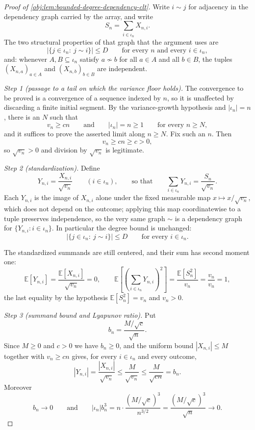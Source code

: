 \begin{proof}[Proof of \cref{obj:lem:bounded-degree-dependency-clt}]
Write \(i\sim j\) for adjacency in the dependency graph carried by the array, and write
\[
S_n=\sum_{i\in\iota_n}X_{n,i}.
\]
The two structural properties of that graph that the argument uses are
\[
\left|\{j\in\iota_n:\ j\sim i\}\right|\le D
\qquad\text{for every }n\text{ and every }i\in\iota_n,
\]
and: whenever \(A,B\subseteq\iota_n\) satisfy \(a\not\sim b\) for all \(a\in A\) and all \(b\in B\), the tuples \((X_{n,a})_{a\in A}\) and \((X_{n,b})_{b\in B}\) are independent.

\textit{Step 1 (passage to a tail on which the variance floor holds).}
The convergence to be proved is a convergence of a sequence indexed by \(n\), so it is unaffected by discarding a finite initial segment. By the variance-growth hypothesis and \(|\iota_n|=n\), there is an \(N\) such that
\[
v_n\ge cn
\qquad\text{and}\qquad
|\iota_n|=n\ge 1
\qquad\text{for every }n\ge N,
\]
and it suffices to prove the asserted limit along \(n\ge N\). Fix such an \(n\). Then
\[
v_n\ge cn\ge c>0,
\]
so \(\sqrt{v_n}>0\) and division by \(\sqrt{v_n}\) is legitimate.

\textit{Step 2 (standardization).} Define
\[
Y_{n,i}=\frac{X_{n,i}}{\sqrt{v_n}}
\qquad(i\in\iota_n),
\qquad\text{so that}\qquad
\sum_{i\in\iota_n}Y_{n,i}=\frac{S_n}{\sqrt{v_n}}.
\]
Each \(Y_{n,i}\) is the image of \(X_{n,i}\) alone under the fixed measurable map \(x\mapsto x/\sqrt{v_n}\), which does not depend on the outcome; applying this map coordinatewise to a tuple preserves independence, so the very same graph \(\sim\) is a dependency graph for \(\{Y_{n,i}:i\in\iota_n\}\). In particular the degree bound is unchanged:
\[
\left|\{j\in\iota_n:\ j\sim i\}\right|\le D
\qquad\text{for every }i\in\iota_n.
\]

The standardized summands are still centered, and their sum has second moment one:
\[
\mathbb E\!\left[Y_{n,i}\right]
=\frac{\mathbb E\!\left[X_{n,i}\right]}{\sqrt{v_n}}=0,
\qquad
\mathbb E\!\left[\left(\sum_{i\in\iota_n}Y_{n,i}\right)^{2}\right]
=\frac{\mathbb E\!\left[S_n^{2}\right]}{v_n}
=\frac{v_n}{v_n}
=1,
\]
the last equality by the hypothesis \(\mathbb E[S_n^2]=v_n\) and \(v_n>0\).

\textit{Step 3 (summand bound and Lyapunov ratio).} Put
\[
b_n=\frac{M/\sqrt c}{\sqrt n}.
\]
Since \(M\ge0\) and \(c>0\) we have \(b_n\ge0\), and the uniform bound \(|X_{n,i}|\le M\) together with \(v_n\ge cn\) gives, for every \(i\in\iota_n\) and every outcome,
\[
\left|Y_{n,i}\right|
=\frac{\left|X_{n,i}\right|}{\sqrt{v_n}}
\le\frac{M}{\sqrt{v_n}}
\le\frac{M}{\sqrt{cn}}
=b_n .
\]
Moreover
\[
b_n\longrightarrow 0
\qquad\text{and}\qquad
\left|\iota_n\right|b_n^{3}
=n\cdot\frac{(M/\sqrt c)^{3}}{n^{3/2}}
=\frac{(M/\sqrt c)^{3}}{\sqrt n}
\longrightarrow0 .
\]


\end{proof}
